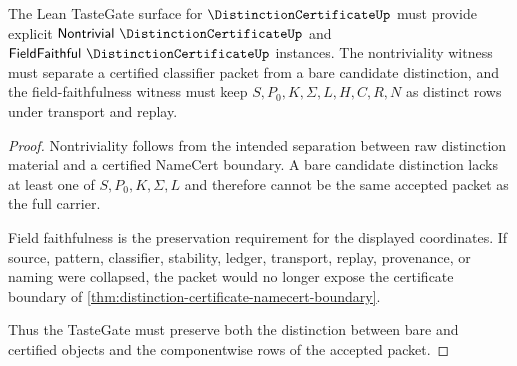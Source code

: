 \begin{theorem}
\label{thm:distinction-certificate-tastegate-requirements}
The Lean TasteGate surface for $\DistinctionCertificateUp$ must provide explicit $\mathsf{Nontrivial}\ \DistinctionCertificateUp$ and $\mathsf{FieldFaithful}\ \DistinctionCertificateUp$ instances. The nontriviality witness must separate a certified classifier packet from a bare candidate distinction, and the field-faithfulness witness must keep $S,P_0,K,\Sigma,L,H,C,R,N$ as distinct rows under transport and replay.
\end{theorem}
\begin{proof}
Nontriviality follows from the intended separation between raw distinction material and a certified NameCert boundary. A bare candidate distinction lacks at least one of $S,P_0,K,\Sigma,L$ and therefore cannot be the same accepted packet as the full carrier.

Field faithfulness is the preservation requirement for the displayed coordinates. If source, pattern, classifier, stability, ledger, transport, replay, provenance, or naming were collapsed, the packet would no longer expose the certificate boundary of \autoref{thm:distinction-certificate-namecert-boundary}.

Thus the TasteGate must preserve both the distinction between bare and certified objects and the componentwise rows of the accepted packet.
\end{proof}




